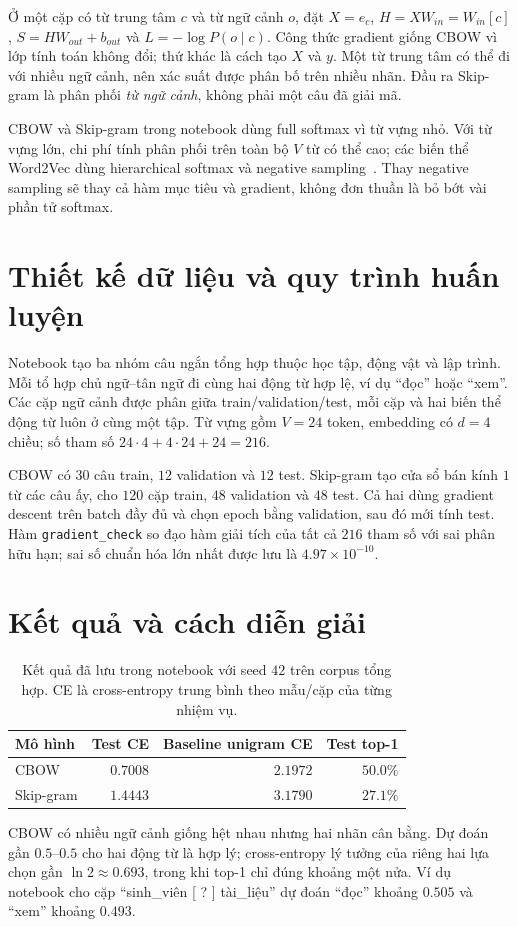 \documentclass[12pt,a4paper]{article}
\begin{document}
Ở một cặp có từ trung tâm $c$ và từ ngữ cảnh $o$, đặt $X=e_c$, $H=XW_{in}=W_{in}[c]$, $S=HW_{out}+b_{out}$ và $L=-\log P(o\mid c)$. Công thức gradient giống CBOW vì lớp tính toán không đổi; thứ khác là cách tạo $X$ và $y$. Một từ trung tâm có thể đi với nhiều ngữ cảnh, nên xác suất được phân bố trên nhiều nhãn. Đầu ra Skip-gram là phân phối \emph{từ ngữ cảnh}, không phải một câu đã giải mã.

CBOW và Skip-gram trong notebook dùng full softmax vì từ vựng nhỏ. Với từ vựng lớn, chi phí tính phân phối trên toàn bộ $V$ từ có thể cao; các biến thể Word2Vec dùng hierarchical softmax và negative sampling~\cite{mikolov2013,mikolov2013negative}. Thay negative sampling sẽ thay cả hàm mục tiêu và gradient, không đơn thuần là bỏ bớt vài phần tử softmax.

\section{Thiết kế dữ liệu và quy trình huấn luyện}
Notebook tạo ba nhóm câu ngắn tổng hợp thuộc học tập, động vật và lập trình. Mỗi tổ hợp chủ ngữ--tân ngữ đi cùng hai động từ hợp lệ, ví dụ ``đọc'' hoặc ``xem''. Các cặp ngữ cảnh được phân giữa train/validation/test, mỗi cặp và hai biến thể động từ luôn ở cùng một tập. Từ vựng gồm $V=24$ token, embedding có $d=4$ chiều; số tham số $24\cdot4+4\cdot24+24=216$.

CBOW có $30$ câu train, $12$ validation và $12$ test. Skip-gram tạo cửa sổ bán kính $1$ từ các câu ấy, cho $120$ cặp train, $48$ validation và $48$ test. Cả hai dùng gradient descent trên batch đầy đủ và chọn epoch bằng validation, sau đó mới tính test. Hàm \texttt{gradient\_check} so đạo hàm giải tích của tất cả $216$ tham số với sai phân hữu hạn; sai số chuẩn hóa lớn nhất được lưu là $4.97\times10^{-10}$.

\section{Kết quả và cách diễn giải}
\begin{table}[ht]
\centering\small
\begin{tabular}{p{3.2cm}rrr}\toprule
Mô hình & Test CE & Baseline unigram CE & Test top-1\\\midrule
CBOW & $0.7008$ & $2.1972$ & $50.0\%$\\
Skip-gram & $1.4443$ & $3.1790$ & $27.1\%$\\\bottomrule
\end{tabular}
\caption{Kết quả đã lưu trong notebook với seed $42$ trên corpus tổng hợp. CE là cross-entropy trung bình theo mẫu/cặp của từng nhiệm vụ.}
\end{table}
CBOW có nhiều ngữ cảnh giống hệt nhau nhưng hai nhãn cân bằng. Dự đoán gần $0.5$--$0.5$ cho hai động từ là hợp lý; cross-entropy lý tưởng của riêng hai lựa chọn gần $\ln 2\approx0.693$, trong khi top-1 chỉ đúng khoảng một nửa. Ví dụ notebook cho cặp ``sinh\_viên [ ? ] tài\_liệu'' dự đoán ``đọc'' khoảng $0.505$ và ``xem'' khoảng $0.493$.
\end{document}
